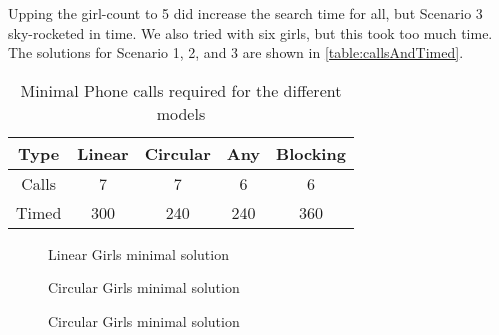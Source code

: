 \documentclass{article}
\begin{document}
Upping the girl-count to 5 did increase the search time for all, but Scenario 3 sky-rocketed in time. We also tried with six girls, but this took too much time. The solutions for Scenario 1, 2, and 3 are shown in \autoref{table:callsAndTimed}.

\begin{table}[h!]
    \centering
    \begin{tabular}{||c | c c c c||} 
        \hline
        Type & Linear & Circular & Any & Blocking \\ [0.5ex] 
        \hline\hline
        Calls &     7 &        7 &   6 &        6 \\
        Timed &   300 &      240 & 240 &      360 \\ [1ex]
        \hline
    \end{tabular}
    \caption{Minimal Phone calls required for the different models}
    \label{table:callsAndTimed}
\end{table}



\begin{figure}
  \centering
  \begin{sequencediagram}
  \end{sequencediagram}
  \caption{Linear Girls minimal solution}
  \label{fig:linSol}
\end{figure}

\begin{figure}
  \centering
  \begin{sequencediagram}
  \end{sequencediagram}
  \caption{Circular Girls minimal solution}
  \label{fig:cirSol}
\end{figure}

\begin{figure}
  \centering
  \begin{sequencediagram}
  \end{sequencediagram}
  \caption{Circular Girls minimal solution}
  \label{fig:anySol}
\end{figure}
\end{document}
